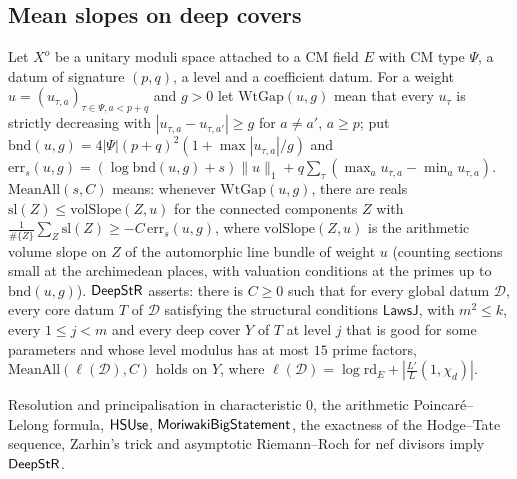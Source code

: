 \subsection{Mean slopes on deep covers}\label{sec:covolume:deep}

\begin{definition}\label{def:covolume:deepstr}
Let $X^o$ be a unitary moduli space attached to a CM field $E$ with CM type $\Psi$, a datum of signature
$(p,q)$, a level and a coefficient datum. For a weight $u=(u_{\tau,a})_{\tau\in\Psi,a<p+q}$ and $g>0$
let $\mathrm{WtGap}(u,g)$ mean that every $u_\tau$ is strictly decreasing with
$|u_{\tau,a}-u_{\tau,a'}|\ge g$ for $a\ne a'$, $a\ge p$; put
$\mathrm{bnd}(u,g)=4|\Psi|(p+q)^2(1+\max|u_{\tau,a}|/g)$ and
$\mathrm{err}_s(u,g)=(\log\mathrm{bnd}(u,g)+s)\|u\|_1+q\sum_\tau(\max_au_{\tau,a}-\min_au_{\tau,a})$.
$\mathrm{MeanAll}(s,C)$ means: whenever $\mathrm{WtGap}(u,g)$, there are reals
$\mathrm{sl}(Z)\le\mathrm{volSlope}(Z,u)$ for the connected components $Z$ with
$\frac1{\#\{Z\}}\sum_Z\mathrm{sl}(Z)\ge-C\,\mathrm{err}_s(u,g)$, where $\mathrm{volSlope}(Z,u)$ is the
arithmetic volume slope on $Z$ of the automorphic line bundle of weight $u$ (counting sections small at
the archimedean places, with valuation conditions at the primes up to $\mathrm{bnd}(u,g)$).
$\mathsf{DeepStR}$ asserts: there is $C\ge0$ such that for every global datum $\mathcal D$, every core
datum $T$ of $\mathcal D$ satisfying the structural conditions $\mathsf{LawsJ}$, with $m^2\le k$, every $1\le j<m$ and every
deep cover $Y$ of $T$ at level $j$ that is good for some parameters and whose level modulus has at most
$15$ prime factors, $\mathrm{MeanAll}(\ell(\mathcal D),C)$ holds on $Y$, where
$\ell(\mathcal D)=\log\mathrm{rd}_E+|\frac{L'}{L}(1,\chi_d)|$.
\end{definition}

\begin{theorem}\Fmark\label{thm:deepstr}
Resolution and principalisation in characteristic $0$, the arithmetic Poincar\'e--Lelong formula,
$\mathsf{HSUse}$, $\mathsf{MoriwakiBigStatement}$, the exactness of the Hodge--Tate sequence, Zarhin's
trick and asymptotic Riemann--Roch for nef divisors imply $\mathsf{DeepStR}$.
\end{theorem}

